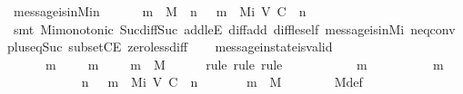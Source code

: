 \begin{isabellebody}
\ message{\isacharunderscore}is{\isacharunderscore}in{\isacharunderscore}M{\isacharunderscore}i{\isacharunderscore}n\ {\isacharcolon}\isanewline
\ \ \ \ {\isachardoublequoteopen}{\isasymforall}\ m\ {\isasymin}\ M{\isachardot}\ {\isasymexists}\ n\ {\isasymin}\ {\isasymnat}{\isachardot}\ m\ {\isasymin}\ M{\isacharunderscore}i\ {\isacharparenleft}V{\isacharcomma}\ C{\isacharcomma}\ {\isasymepsilon}{\isacharparenright}\ n{\isachardoublequoteclose}\isanewline
%
\isadelimproof
\ \ \ \ %
\endisadelimproof
%
\isatagproof
{}\isamarkupfalse%
\ {\isacharparenleft}smt\ Mi{\isacharunderscore}monotonic\ Suc{\isacharunderscore}diff{\isacharunderscore}Suc\ add{\isacharunderscore}leE\ diff{\isacharunderscore}add\ diff{\isacharunderscore}le{\isacharunderscore}self\ message{\isacharunderscore}is{\isacharunderscore}in{\isacharunderscore}M{\isacharunderscore}i\ neq{}{\isacharunderscore}conv\ plus{\isacharunderscore}{}{\isacharunderscore}eq{\isacharunderscore}Suc\ subsetCE\ zero{\isacharunderscore}less{\isacharunderscore}diff{\isacharparenright}%
\endisatagproof
{\isafoldproof}%
%
\isadelimproof
\isanewline
%
\endisadelimproof
\isanewline
\ \ \isamarkupfalse%
\ message{\isacharunderscore}in{\isacharunderscore}state{\isacharunderscore}is{\isacharunderscore}valid\ {\isacharcolon}\isanewline
\ \ \ \ {\isachardoublequoteopen}{\isasymforall}\ {\isasymsigma}\ m{\isachardot}\ {\isasymsigma}\ {\isasymin}\ {\isasymSigma}\ {\isasymand}\ m\ {\isasymin}\ {\isasymsigma}\ {\isasymlongrightarrow}\ \ m\ {\isasymin}\ M{\isachardoublequoteclose}\isanewline
%
\isadelimproof
\ \ \ \ %
\endisadelimproof
%
\isatagproof
{}\isamarkupfalse%
\ {\isacharparenleft}rule{\isacharcomma}\ rule{\isacharcomma}\ rule{\isacharparenright}\isanewline
\ \ \isamarkupfalse%
\ {\isacharminus}\isanewline
\ \ \ \ \isamarkupfalse%
\ {\isasymsigma}\ m\isanewline
\ \ \ \ \isamarkupfalse%
\ {\isachardoublequoteopen}{\isasymsigma}\ {\isasymin}\ {\isasymSigma}\ {\isasymand}\ m\ {\isasymin}\ {\isasymsigma}{\isachardoublequoteclose}\isanewline
\ \ \ \ \isamarkupfalse%
\isanewline
\ \ \ \ \ \ {\isachardoublequoteopen}{\isasymexists}\ n\ {\isasymin}\ {\isasymnat}{\isachardot}\ m\ {\isasymin}\ M{\isacharunderscore}i\ {\isacharparenleft}V{\isacharcomma}\ C{\isacharcomma}\ {\isasymepsilon}{\isacharparenright}\ n\isanewline
\ \ \ \ \ \ {\isasymLongrightarrow}\ m\ {\isasymin}\ M{\isachardoublequoteclose}\isanewline
\ \ \ \ \ \ \isamarkupfalse%
\ M{\isacharunderscore}def\ \isamarkupfalse%

\end{isabellebody}
